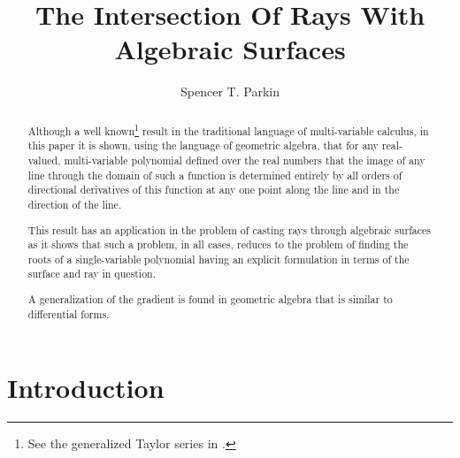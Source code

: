 \documentclass{birkjour}
\theoremstyle{definition}
\theoremstyle{remark}
\numberwithin{equation}{section}
\begin{document}
%
%
%
%
%
%
%
%

\title{The Intersection Of Rays With\\Algebraic Surfaces}

\author{Spencer T. Parkin}
\address{102 W. 500 S., Salt Lake City, UT  84101}




\begin{abstract}
Although a well known\footnote{See the generalized Taylor series in \cite{Weisstein13}.} result in the traditional language of multi-variable calculus,
in this paper it is shown, using the language of geometric algebra, that for any
real-valued, multi-variable polynomial defined over the
real numbers that the image of any line through the domain of such a function
is determined entirely by all orders of directional derivatives of this function at
any one point along the line and in the direction of the line.

This result has an
application in the problem of casting rays through algebraic surfaces as it
shows that such a problem, in all cases, reduces to the problem of finding
the roots of a single-variable polynomial having an explicit formulation
in terms of the surface and ray in question.

A generalization of the gradient is found in geometric algebra that is
similar to differential forms.
\end{abstract}

\maketitle

\section{Introduction}
\end{document}
